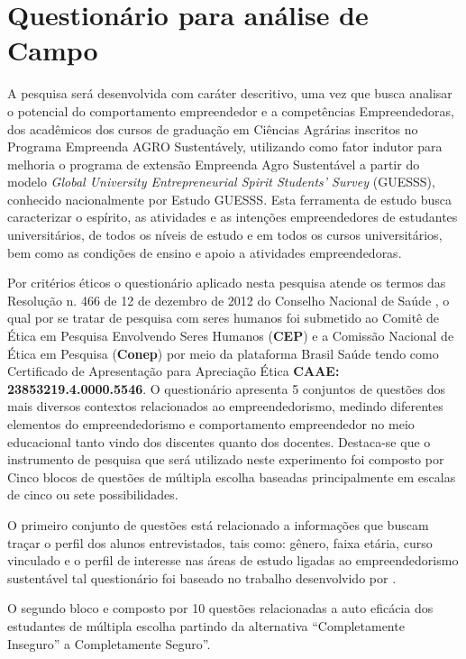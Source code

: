 \newpage
\section{Questionário para análise de Campo}

A pesquisa será desenvolvida com caráter descritivo, uma vez que busca analisar o potencial do comportamento empreendedor e a competências Empreendedoras, dos acadêmicos dos cursos de graduação em Ciências Agrárias inscritos no Programa Empreenda AGRO Sustentávely, utilizando como fator indutor para melhoria o programa de extensão Empreenda Agro Sustentável a partir do modelo \textit{Global University Entrepreneurial Spirit Students’ Survey} (GUESSS), conhecido nacionalmente por Estudo GUESSS. Esta ferramenta de estudo busca caracterizar o espírito, as atividades e as intenções empreendedores de estudantes universitários, de todos os níveis de estudo e em todos os cursos universitários, bem como as condições de ensino e apoio a atividades empreendedoras. 




Por critérios éticos o questionário aplicado nesta pesquisa atende os termos das Resolução n. 466 de 12 de dezembro de 2012 do Conselho Nacional de Saúde \cite{cns_resolucao_2012}, o qual por se tratar de pesquisa com seres humanos foi submetido ao Comitê de Ética em Pesquisa Envolvendo Seres Humanos (\textbf{CEP}) e a Comissão Nacional de Ética em Pesquisa (\textbf{Conep}) por meio da plataforma Brasil Saúde tendo como Certificado de Apresentação para Apreciação Ética \textbf{CAAE: 23853219.4.0000.5546}. O questionário apresenta 5 conjuntos de questões dos mais diversos contextos relacionados ao empreendedorismo, medindo diferentes elementos do empreendedorismo e comportamento empreendedor no meio educacional tanto vindo dos discentes quanto dos docentes. Destaca-se que o instrumento de pesquisa que será utilizado neste experimento foi composto por Cinco blocos de questões de múltipla escolha baseadas principalmente em escalas de cinco ou sete possibilidades. 

O primeiro conjunto de questões está relacionado a informações que buscam traçar o perfil dos alunos entrevistados, tais como: gênero, faixa etária, curso vinculado e o perfil de interesse nas áreas de estudo ligadas ao empreendedorismo sustentável tal questionário foi baseado no trabalho desenvolvido por . 

O segundo bloco e composto por 10 questões relacionadas a auto eficácia dos estudantes de múltipla escolha partindo da alternativa “Completamente Inseguro” a Completamente Seguro”. 

